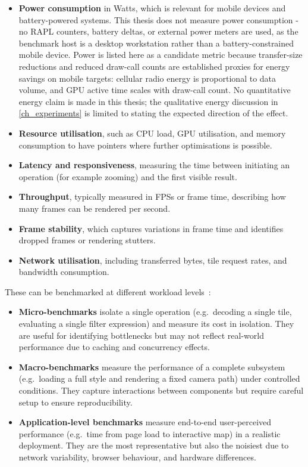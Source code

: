 \begin{itemize}
    \item \textbf{Power consumption} in Watts, which is relevant for mobile devices and battery-powered systems.  This thesis does not measure power consumption - no RAPL counters, battery deltas, or external power meters are used, as the benchmark host is a desktop workstation rather than a battery-constrained mobile device.  Power is listed here as a candidate metric because transfer-size reductions and reduced draw-call counts are established proxies for energy savings on mobile targets: cellular radio energy is proportional to data volume, and GPU active time scales with draw-call count.  No quantitative energy claim is made in this thesis; the qualitative energy discussion in \cref{ch_experiments} is limited to stating the expected direction of the effect.
    \item \textbf{Resource utilisation}, such as CPU load, GPU utilisation, and memory consumption to have pointers where further optimisations is possible.
    \item \textbf{Latency and responsiveness}, measuring the time between initiating an operation (for example zooming) and the first visible result.
    \item \textbf{Throughput}, typically measured in \acp{FPS} or frame time, describing how many frames can be rendered per second.
    \item \textbf{Frame stability}, which captures variations in frame time and identifies dropped frames or rendering stutters.
    \item \textbf{Network utilisation}, including transferred bytes, tile request rates, and bandwidth consumption.
\end{itemize}

These can be benchmarked at different workload levels~\cite{jainArtComputerSystems1991}:

\begin{itemize}
    \item \textbf{Micro-benchmarks} isolate a single operation (e.g.\ decoding a single tile, evaluating a single filter expression) and measure its cost in isolation. They are useful for identifying bottlenecks but may not reflect real-world performance due to caching and concurrency effects.
    \item \textbf{Macro-benchmarks} measure the performance of a complete subsystem (e.g.\ loading a full style and rendering a fixed camera path) under controlled conditions. They capture interactions between components but require careful setup to ensure reproducibility.
    \item \textbf{Application-level benchmarks} measure end-to-end user-perceived performance (e.g.\ time from page load to interactive map) in a realistic deployment. They are the most representative but also the noisiest due to network variability, browser behaviour, and hardware differences.
\end{itemize}

